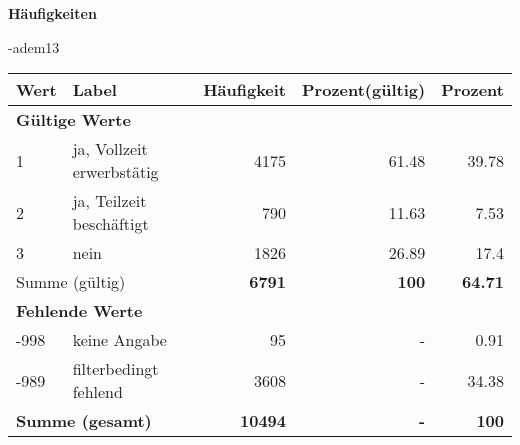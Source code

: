         		\vspace*{0.5cm}
                \noindent\textbf{Häufigkeiten}

                \vspace*{-\baselineskip}
					\begin{filecontents}{\jobname-adem13}
					\begin{longtable}{lXrrr}
					\toprule
					\textbf{Wert} & \textbf{Label} & \textbf{Häufigkeit} & \textbf{Prozent(gültig)} & \textbf{Prozent} \\
					\endhead
					\midrule
					\multicolumn{5}{l}{\textbf{Gültige Werte}}\\

					1 &
					\multicolumn{1}{X}{ ja, Vollzeit erwerbstätig   } &


					  \num{4175} &
					  \num[round-mode=places,round-precision=2]{61,48} &
					    \num[round-mode=places,round-precision=2]{39,78} \\

					2 &
					\multicolumn{1}{X}{ ja, Teilzeit beschäftigt   } &


					  \num{790} &
					  \num[round-mode=places,round-precision=2]{11,63} &
					    \num[round-mode=places,round-precision=2]{7,53} \\

					3 &
					\multicolumn{1}{X}{ nein   } &


					  \num{1826} &
					  \num[round-mode=places,round-precision=2]{26,89} &
					    \num[round-mode=places,round-precision=2]{17,4} \\
					\midrule
					\multicolumn{2}{l}{Summe (gültig)} &
					  \textbf{\num{6791}} &
					\textbf{100} &
					  \textbf{\num[round-mode=places,round-precision=2]{64,71}} \\
					\multicolumn{5}{l}{\textbf{Fehlende Werte}}\\
							-998 &
							keine Angabe &
							  \num{95} &
							 - &
							  \num[round-mode=places,round-precision=2]{0,91} \\
							-989 &
							filterbedingt fehlend &
							  \num{3608} &
							 - &
							  \num[round-mode=places,round-precision=2]{34,38} \\
					\midrule
					\multicolumn{2}{l}{\textbf{Summe (gesamt)}} &
				      \textbf{\num{10494}} &
				    \textbf{-} &
				    \textbf{100} \\
					\bottomrule
					\end{longtable}
					\end{filecontents}
